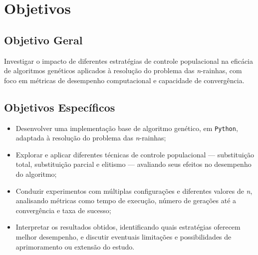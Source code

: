\section{Objetivos}

\subsection{Objetivo Geral}

Investigar o impacto de diferentes estratégias de controle populacional na eficácia de algoritmos genéticos aplicados à resolução do problema das \textit{n}-rainhas, com foco em métricas de desempenho computacional e capacidade de convergência.

\subsection{Objetivos Específicos}

\begin{itemize}
\item Desenvolver uma implementação base de algoritmo genético, em \texttt{Python}, adaptada à resolução do problema das \textit{n}-rainhas;
\item Explorar e aplicar diferentes técnicas de controle populacional — substituição total, substituição parcial e elitismo — avaliando seus efeitos no desempenho do algoritmo;
\item Conduzir experimentos com múltiplas configurações e diferentes valores de \textit{n}, analisando métricas como tempo de execução, número de gerações até a convergência e taxa de sucesso;
\item Interpretar os resultados obtidos, identificando quais estratégias oferecem melhor desempenho, e discutir eventuais limitações e possibilidades de aprimoramento ou extensão do estudo.
\end{itemize}
